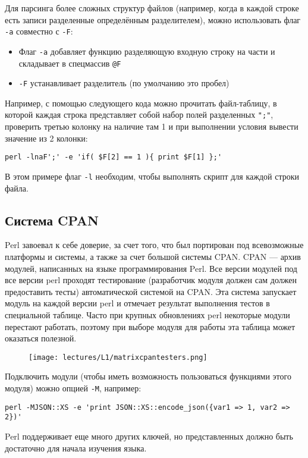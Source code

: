Для парсинга более сложных структур файлов (например, когда в каждой строке есть записи разделенные определённым разделителем), можно использовать флаг  \verb|-a| совместно с \verb|-F|:
\begin{itemize}
  \item Флаг \verb|-a| добавляет функцию разделяющую входную строку на части и складывает в спецмассив \verb|@F|
  \item \verb|-F| устанавливает разделитель (по умолчанию это пробел)
\end{itemize}
Например, с помощью следующего кода можно прочитать файл-таблицу, в которой каждая строка представляет собой набор полей разделенных \verb|";"|, проверить третью колонку на наличие там 1 и при выполнении условия вывести значение из 2 колонки:
\begin{verbatim}
perl -lnaF';' -e 'if( $F[2] == 1 ){ print $F[1] };'
\end{verbatim}
В этом примере флаг \verb|-l| необходим, чтобы выполнять скрипт для каждой строки файла.

\subsection{Система CPAN}
Perl завоевал к себе доверие, за счет того, что был портирован под всевозможные платформы и системы, а также за счет большой системы CPAN. CPAN --- архив модулей, написанных на языке программирования Perl.
Все версии модулей под все версии perl проходят тестирование (разработчик модуля должен сам должен предоставить тесты) автоматической системой на CPAN. Эта система запускает модуль на каждой версии perl и отмечает результат выполнения тестов в специальной таблице. Часто при крупных обновлениях perl некоторые модули перестают работать, поэтому при выборе модуля для работы эта таблица может оказаться полезной.

\begin{figure}[H] \centering
  \texttt{[image: lectures/L1/matrixcpantesters.png]}
\end{figure}\noindent

Подключить модули (чтобы иметь возможность пользоваться функциями этого модуля) можно опцией \verb|-M|, например:
\begin{verbatim}
perl -MJSON::XS -e 'print JSON::XS::encode_json({var1 => 1, var2 => 2})'
\end{verbatim}
Perl поддерживает еще много других ключей, но представленных должно быть достаточно для начала изучения языка.

